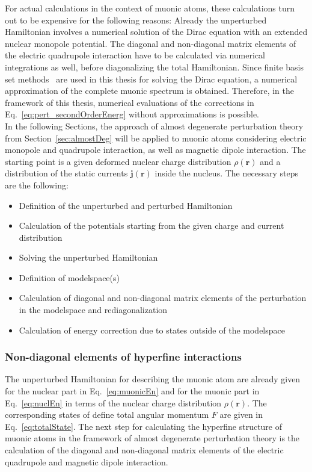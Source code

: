 For actual calculations in the context of muonic atoms, these calculations turn out to be expensive for the following reasons: Already the unperturbed Hamiltonian involves a numerical solution of the Dirac equation with an extended nuclear monopole potential. The diagonal and non-diagonal matrix elements of the electric quadrupole interaction have to be calculated via numerical integrations as well, before diagonalizing the total Hamiltonian. Since finite basis set methods~\cite{Shabaev2004} are used in this thesis for solving the Dirac equation, a numerical approximation of the complete muonic spectrum is obtained. Therefore, in the framework of this thesis, numerical evaluations of the corrections in Eq.~\eqref{eq:pert_secondOrderEnerg} without approximations is possible.\\

In the following Sections, the approach of almost degenerate perturbation theory from Section~\ref{sec:almostDeg} will be applied to muonic atoms considering electric monopole and quadrupole interaction, as well as magnetic dipole interaction. The starting point is a given deformed nuclear charge distribution $\rho(\mathbf{r})$ and a distribution of the static currents $\mathbf{j}(\mathbf{r})$ inside the nucleus.
The necessary steps are the following:
\begin{itemize}
\item Definition of the unperturbed  and perturbed Hamiltonian
\item Calculation of the potentials starting from the given charge and current distribution
\item Solving the unperturbed Hamiltonian
\item Definition of modelspace(s)
\item Calculation of diagonal and non-diagonal matrix elements of the perturbation in the modelspace and rediagonalization
\item Calculation of energy correction due to states outside of the modelspace
\end{itemize}


\subsubsection{Non-diagonal elements of hyperfine interactions}
\label{sec:non-diagElements}
The unperturbed Hamiltonian for describing the muonic atom are already given for the nuclear part in Eq.~\eqref{eq:muonicEn} and for the muonic part in Eq.~\eqref{eq:nuclEn} in terms of the nuclear charge distribution $\rho(\mathbf{r})$. The corresponding states of define total angular momentum $F$ are given in Eq.~\eqref{eq:totalState}.
The next step for calculating the hyperfine structure of muonic atoms in the framework of almost degenerate perturbation theory is the calculation of the diagonal and non-diagonal matrix elements of the electric quadrupole and magnetic dipole interaction.

